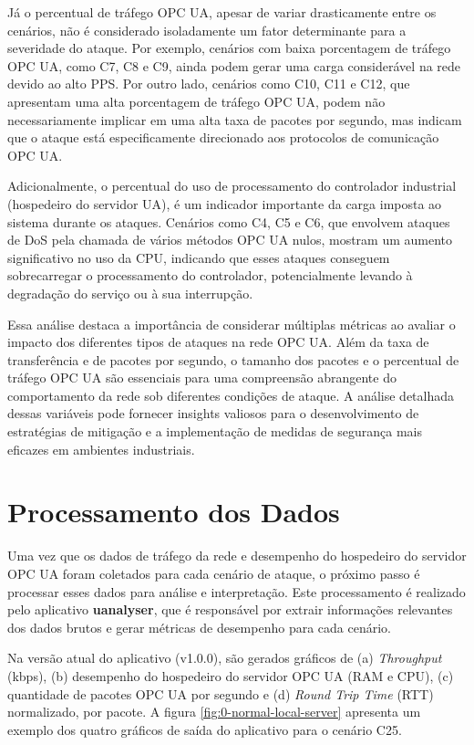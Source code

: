 Já o percentual de tráfego OPC UA, apesar de variar drasticamente entre os cenários, não é considerado isoladamente um fator determinante para a severidade do ataque. Por exemplo, cenários com baixa porcentagem de tráfego OPC UA, como C7, C8 e C9, ainda podem gerar uma carga considerável na rede devido ao alto PPS. Por outro lado, cenários como C10, C11 e C12, que apresentam uma alta porcentagem de tráfego OPC UA, podem não necessariamente implicar em uma alta taxa de pacotes por segundo, mas indicam que o ataque está especificamente direcionado aos protocolos de comunicação OPC UA.

Adicionalmente, o percentual do uso de processamento do controlador industrial (hospedeiro do servidor UA), é um indicador importante da carga imposta ao sistema durante os ataques. Cenários como C4, C5 e C6, que envolvem ataques de DoS pela chamada de vários métodos OPC UA nulos, mostram um aumento significativo no uso da CPU, indicando que esses ataques conseguem sobrecarregar o processamento do controlador, potencialmente levando à degradação do serviço ou à sua interrupção.

Essa análise destaca a importância de considerar múltiplas métricas ao avaliar o impacto dos diferentes tipos de ataques na rede OPC UA. Além da taxa de transferência e de pacotes por segundo, o tamanho dos pacotes e o percentual de tráfego OPC UA são essenciais para uma compreensão abrangente do comportamento da rede sob diferentes condições de ataque. A análise detalhada dessas variáveis pode fornecer insights valiosos para o desenvolvimento de estratégias de mitigação e a implementação de medidas de segurança mais eficazes em ambientes industriais.

\section{Processamento dos Dados} \label{sec:processamento-dados}

Uma vez que os dados de tráfego da rede e desempenho do hospedeiro do servidor OPC UA foram coletados para cada cenário de ataque, o próximo passo é processar esses dados para análise e interpretação. Este processamento é realizado pelo aplicativo \textbf{uanalyser}, que é responsável por extrair informações relevantes dos dados brutos e gerar métricas de desempenho para cada cenário.

Na versão atual do aplicativo (v1.0.0), são gerados gráficos de (a) \textit{Throughput} (kbps), (b) desempenho do hospedeiro do servidor OPC UA (RAM e CPU), (c) quantidade de pacotes OPC UA por segundo e (d) \textit{Round Trip Time} (RTT) normalizado, por pacote. A figura \autoref{fig:0-normal-local-server} apresenta um exemplo dos quatro gráficos de saída do aplicativo para o cenário C25.

